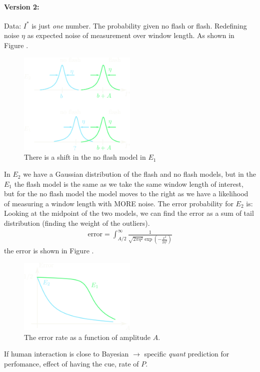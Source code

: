 \documentclass[../main.tex]{subfiles}
\begin{document}
\paragraph*{Version 2:} Data: $I^*$ is just \emph{one} number. The probability given no flash or 
flash. Redefining noise $\eta$ as expected noise of measurement over window length. As shown in
Figure . 
\begin{figure}
    \centering
    \includegraphics[width=0.5\textwidth]{vision_v2.png}
    \caption{There is a shift in the no flash model in $E_1$}
    \label{fig:flash4}
\end{figure}

In $E_2$ we have a Gaussian distribution of the flash and no flash models, but in the $E_1$
the flash model is the same as we take the same window length of interest, but for the no flash model
the model moves to the right as we have a likelihood of measuring a window length with MORE noise. 
The error probability for $E_2$ is: Looking at the midpoint of the two models, we can find the error
as a sum of tail distribution (finding the weight of the outliers).
\begin{align*}
    \text{error} = \int_{A/2}^\infty \frac{1}{\sqrt{2\pi\eta^2} \exp(-\frac{x^2}{2\eta^2})} 
\end{align*}
the error is shown in Figure .
\begin{figure}[ht]
    \centering
    \includegraphics[width=0.5\textwidth]{v_error.png}
    \caption{The error rate as a function of amplitude $A$.}
    \label{fig:flash5}
\end{figure}
If human interaction is close to Bayesian $\to$ specific \emph{quant}
prediction for perfomance, effect of having the cue, rate of $P$.
\end{document}
